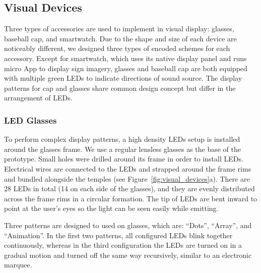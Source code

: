\documentclass{sigchi}
\begin{document}
\subsection{Visual Devices}
Three types of accessories are used to implement in visual display: glasses, baseball cap, and smartwatch. Due to the shape and size of each device are noticeably different, we designed three types of encoded schemes for each accessory. Except for smartwatch, which uses its native display panel and runs micro App to display sign imagery, glasses and baseball cap are both equipped with multiple green LEDs to indicate directions of sound source. The display patterns for cap and glasses share common design concept but differ in the arrangement of LEDs. 

%


\subsubsection{LED Glasses}
To perform complex display patterns, a high density LEDs setup is installed around the glasses frame. We use a regular lensless glasses as the base of the prototype. Small holes were drilled around its frame in order to install LEDs. Electrical wires are connected to the LEDs and strapped around the frame rims and bundled alongside the temples (see Figure~\ref{fig:visual_devices}a). There are 28 LEDs in total (14 on each side of the glasses), and they are evenly distributed across the frame rims in a circular formation. The tip of LEDs are bent inward to point at the user's eyes so the light can be seen easily while emitting.

Three patterns are designed to used on glasses, which are: \textquotedblleft Dots\textquotedblright, \textquotedblleft Array\textquotedblright, and \textquotedblleft Animation\textquotedblright. In the first two patterns, all configured LEDs blink together continuously, whereas in the third configuration the LEDs are turned on in a gradual motion and turned off the same way recursively, similar to an electronic marquee.
\end{document}
